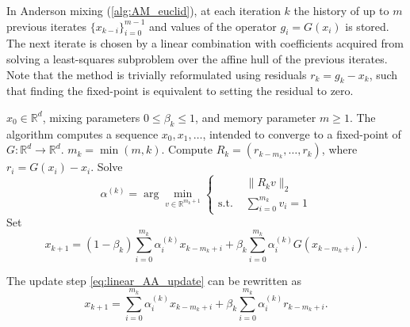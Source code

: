 \documentclass{article} %
\numberwithin{equation}{subsection}
\numberwithin{theorem}{section}
\begin{document}
        In Anderson mixing (\autoref{alg:AM_euclid}), at each iteration $k$ the history of up to $m$ previous iterates $\{x_{k - i}\}_{i=0}^{m-1}$ and values of the operator $g_i = G(x_i)$ is stored. 
        The next iterate is chosen  by a linear combination with coefficients acquired from solving a least-squares subproblem over the affine hull of the previous iterates.
        Note that the method is trivially reformulated using residuals $r_k = g_k - x_k$, such that finding the fixed-point is equivalent to setting the residual to zero.
        \begin{algorithm}
            \caption{Anderson mixing in $\mathbb{R}^d$}
            \label{alg:AM_euclid}
            \begin{algorithmic}[1]
                \REQUIRE $x_0 \in \mathbb{R}^d$, mixing parameters $0 \leq \beta_k \leq 1$, and memory parameter $m \geq 1$.
                \ENSURE The algorithm computes a sequence $x_0, x_1, \dots$, intended to converge to a fixed-point of $G : \mathbb{R}^d \to \mathbb{R}^d$.
                    \STATE $m_k = \min(m, k)$.
                    \STATE Compute $R_k = (r_{k - m_k}, \dots, r_k)$, where $r_i = G(x_i) - x_i$.
                    \STATE Solve
                    \begin{equation}\label{eq:linear_AA_minimization}
                        \alpha^{(k)} = \arg\min_{v \in \mathbb{R}^{m_k+1} } 
                            \left\{\begin{aligned}
                                &\|R_k v\|_2 \\
                                \text{s.t. } &\sum_{i=0}^{m_k} v_i = 1
                            \end{aligned}\right.
                    \end{equation}
                    \STATE Set
                    \begin{equation}\label{eq:linear_AA_update}
                        x_{k+1} = (1 - \beta_k) \sum_{i=0}^{m_k} \alpha_i^{(k)} x_{k - m_k + i} + \beta_k \sum_{i=0}^{m_k} \alpha_i^{(k)} G(x_{k - m_k + i}).
                    \end{equation}
                \ENDFOR
                \end{algorithmic}
        \end{algorithm}
        \FloatBarrier
        The update step \eqref{eq:linear_AA_update} can be rewritten as 
        \[
            x_{k+1} = \sum_{i=0}^{m_k} \alpha_i^{(k)} x_{k - m_k + i} + \beta_k \sum_{i=0}^{m_k} \alpha_i^{(k)} r_{k - m_k + i}.
        \]
\end{document}
